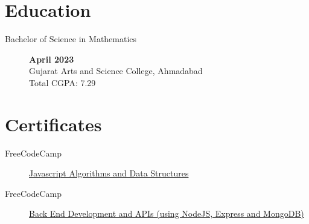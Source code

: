 \documentclass[a4paper,10pt]{article}
\begin{document}
\section{Education}

\begin{description}
    \item[Bachelor of Science in Mathematics ] \hfill  \textbf{April 2023} \\
        Gujarat Arts and Science College, Ahmadabad
        \\ Total CGPA\@: 7.29
\end{description}

\section{Certificates}
\begin{description}
    \item[FreeCodeCamp]
        \href{https://www.freecodecamp.org/certification/jaydamani/javascript-algorithms-and-data-structures}{
            Javascript Algorithms and Data Structures
        }
    \item[FreeCodeCamp]
        \href{https://www.freecodecamp.org/certification/jaydamani/back-end-development-and-apis}{
            Back End Development and APIs (using NodeJS, Express and MongoDB)
        }
\end{description}
\end{document}

